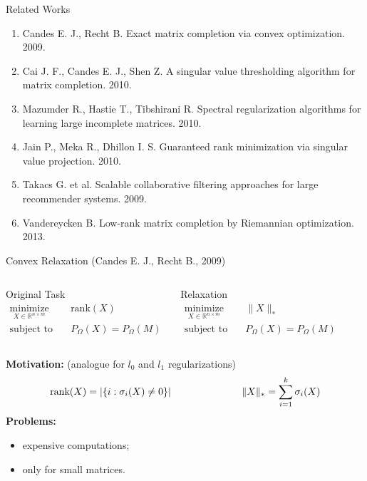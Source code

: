 \documentclass{beamer}
\begin{document}
\begin{frame}{Related Works}
\begin{enumerate}
	\item Candes E. J., Recht B. Exact matrix completion via convex optimization. 2009.
	\item Cai J. F., Candes E. J., Shen Z. A singular value thresholding algorithm for matrix completion. 2010.
	\item Mazumder R., Hastie T., Tibshirani R. Spectral regularization algorithms for learning large incomplete matrices. 2010.
	\item Jain P., Meka R., Dhillon I. S. Guaranteed rank minimization via singular value projection. 2010.
	\item Takacs G. et al. Scalable collaborative filtering approaches for large recommender systems. 2009.
	\item Vandereycken B. Low-rank matrix completion by Riemannian optimization. 2013.
\end{enumerate}
\end{frame}
\begin{frame}{Convex Relaxation (Candes E. J., Recht B., 2009)}  \begin{columns}[c]
	\begin{block}{Original Task}
		\vspace{-0.5cm}
		\begin{align*}
		\mathop{\text{minimize}}\limits_{X \in \mathbb{R}^{n \times m}} \quad & 
		\text{rank} (X) \\
		\text{subject to} \quad & P_{\Omega} (X) = P_{\Omega} (M)
		\end{align*}
	\end{block}
	
	\begin{block}{Relaxation}
		\vspace{-0.5cm}
		\begin{align*}
		\mathop{\text{minimize}}\limits_{X \in \mathbb{R}^{n \times m}} \quad & 
		\| X \|_* \\
		\text{subject to} \quad & P_{\Omega} (X) = P_{\Omega} (M)
		\end{align*}
	\end{block}
\end{columns}
\vspace{0.3cm}
\textbf{Motivation:} (analogue for $l_0$ and $l_1$ regularizations)
$$
	\text{rank} (X) = |\{ i: \sigma_i(X) \neq 0\}|  \hspace{2.5cm} 
	\| X \|_* = \sum_{i=1}^{k} \sigma_i(X)
$$
\textbf{Problems:}
\begin{itemize}
	\item expensive computations;
	\item only for small matrices.
\end{itemize}
\end{frame}
\end{document}

